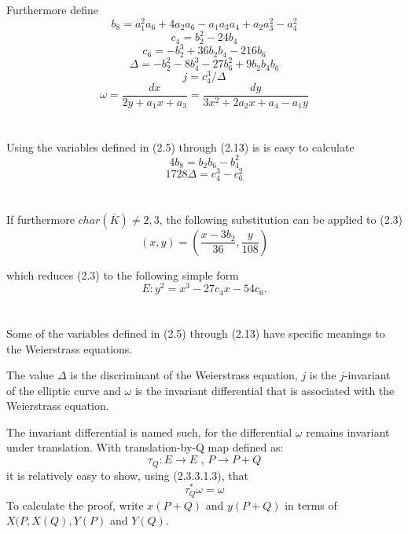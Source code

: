 Furthermore define
\begin{equation}
b_8=a_1^2a_6+4a_2a_6-a_1a_3a_4+a_2a_3^2-a_4^2
\end{equation}
\begin{equation}
c_4=b_2^2-24b_4
\end{equation}
\begin{equation}
c_6=-b_2^3+36b_2b_4-216b_6
\end{equation}
\begin{equation}
\Delta=-b_2^2-8b_4^3-27b_6^2+9b_2b_4b_6
\end{equation}
\begin{equation}
j=c_4^3/\Delta
\end{equation}
\begin{equation}
\omega=\frac{dx}{2y+a_1x+a_3}=\frac{dy}{3x^2+2a_2x+a_4-a_1y}
\end{equation}
\\
\\
Using the variables defined in (2.5) through (2.13) is is easy to calculate
\begin{equation*}
4b_8=b_2b_6-b_4^2
\end{equation*}
\begin{equation*}
1728\Delta=c_4^3-c_6^2
\end{equation*}
\\
\\
If furthermore $char(\bar{K})\neq 2,3$, the following substitution can be applied to (2.3)
\begin{equation*}
(x,y)=(\frac{x-3b_2}{36},\frac{y}{108})
\end{equation*}

which reduces (2.3) to the following simple form
\begin{equation}
E:y^2=x^3-27c_4x-54c_6.
\end{equation}
\\
\\
Some of the variables defined in (2.5) through (2.13) have specific meanings to the Weierstrass equations.
\begin{defn}
	The value $\Delta$ is the discriminant of the Weierstrass equation, $j$ is the $j$-invariant of the elliptic curve and $\omega$ is the invariant differential that is associated with the Weierstrass equation.
\end{defn}

\begin{defn}
	The invariant differential is named such, for the differential $\omega$ remains invariant under translation. With translation-by-Q map defined as:
	\begin{equation*}
	\tau_Q:E\to E\text{ ,	}P\to P+Q
	\end{equation*}
	it is relatively easy to show, using (2.3.3.1.3), that
	\begin{equation*}
	\tau_Q^*\omega=\omega
	\end{equation*}
	To calculate the proof, write $x(P+Q)$ and $y(P+Q)$ in terms of $X(P,X(Q),Y(P)$ and $Y(Q)$.
\end{defn}

